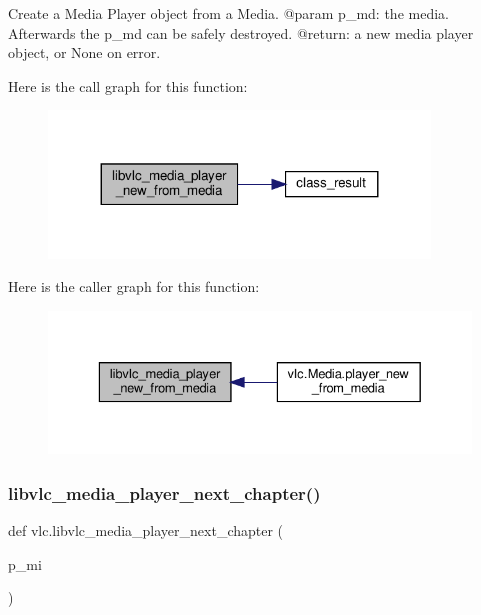 \begin{DoxyVerb}Create a Media Player object from a Media.
@param p_md: the media. Afterwards the p_md can be safely destroyed.
@return: a new media player object, or None on error.
\end{DoxyVerb}
 Here is the call graph for this function\+:
\nopagebreak
\begin{figure}[H]
\begin{center}
\leavevmode
\includegraphics[width=287pt]{namespacevlc_a552e823b93376bc5531aaea72b1526c5_cgraph}
\end{center}
\end{figure}
Here is the caller graph for this function\+:
\nopagebreak
\begin{figure}[H]
\begin{center}
\leavevmode
\includegraphics[width=329pt]{namespacevlc_a552e823b93376bc5531aaea72b1526c5_icgraph}
\end{center}
\end{figure}
\mbox{\label{namespacevlc_a3aeeb47d986476bf88849c78532bf066}} 
\subsubsection{\texorpdfstring{libvlc\+\_\+media\+\_\+player\+\_\+next\+\_\+chapter()}{libvlc\_media\_player\_next\_chapter()}}
{\footnotesize\ttfamily def vlc.\+libvlc\+\_\+media\+\_\+player\+\_\+next\+\_\+chapter (\begin{DoxyParamCaption}\item[{}]{p\+\_\+mi }\end{DoxyParamCaption})}

